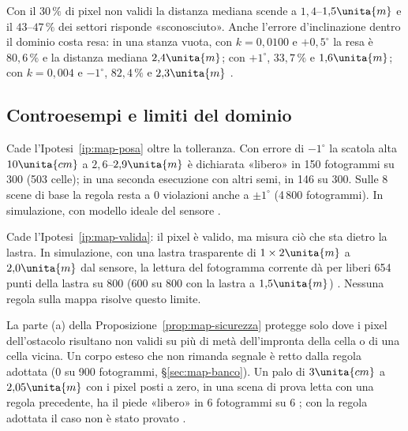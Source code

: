 Con il $30\,\%$ di pixel non validi la distanza mediana scende a $1{,}4$–$1{,}5\unita{m}$ e il $43$–$47\,\%$ dei settori risponde «sconosciuto». Anche l'errore d'inclinazione dentro il dominio costa resa: in una stanza vuota, con $k=0{,}0100$ e $+0{,}5^\circ$ la resa è $80{,}6\,\%$ e la distanza mediana $2{,}4\unita{m}$; con $+1^\circ$, $33{,}7\,\%$ e $1{,}6\unita{m}$; con $k=0{,}004$ e $-1^\circ$, $82{,}4\,\%$ e $2{,}3\unita{m}$ .

\subsection{Controesempi e limiti del dominio}\label{sec:map-controesempi}

\begin{controesempio}\label{cex:map-inclinazione}
Cade l'Ipotesi~\ref{ip:map-posa} oltre la tolleranza. Con errore di $-1^\circ$ la scatola alta $10\unita{cm}$ a $2{,}6$–$2{,}9\unita{m}$ è dichiarata «libero» in 150 fotogrammi su 300 (503 celle); in una seconda esecuzione con altri semi, in 146 su 300. Sulle 8 scene di base la regola resta a 0 violazioni anche a $\pm1^\circ$ (4\,800 fotogrammi). In simulazione, con modello ideale del sensore .
\end{controesempio}

\begin{controesempio}\label{cex:map-vetro}
Cade l'Ipotesi~\ref{ip:map-valida}: il pixel è valido, ma misura ciò che sta dietro la lastra. In simulazione, con una lastra trasparente di $1\times2\unita{m}$ a $2{,}0\unita{m}$ dal sensore, la lettura del fotogramma corrente dà per liberi 654 punti della lastra su 800 (600 su 800 con la lastra a $1{,}5\unita{m}$) . Nessuna regola sulla mappa risolve questo limite.
\end{controesempio}

\begin{controesempio}\label{cex:map-muto}
La parte (a) della Proposizione~\ref{prop:map-sicurezza} protegge solo dove i pixel dell'ostacolo risultano non validi su più di metà dell'impronta della cella o di una cella vicina. Un corpo esteso che non rimanda segnale è retto dalla regola adottata (0 su 900 fotogrammi, \S\ref{sec:map-banco}). Un palo di $3\unita{cm}$ a $2{,}05\unita{m}$ con i pixel posti a zero, in una scena di prova letta con una regola precedente, ha il piede «libero» in 6 fotogrammi su 6 ; con la regola adottata il caso non è stato provato .
\end{controesempio}

